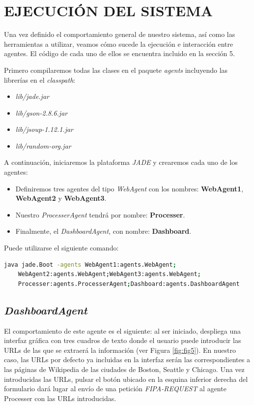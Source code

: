 \documentclass{estilo}
\begin{document}
    \bigskip
    
    \newpage
    \section{EJECUCIÓN DEL SISTEMA}
    
    Una vez definido el comportamiento general de nuestro sistema, así como las herramientas a utilizar, veamos cómo sucede la ejecución e interacción entre agentes. El código de cada uno de ellos se encuentra incluido en la sección 5.
    
    Primero compilaremos todas las clases en el paquete \textit{agents} incluyendo las librerías en el \textit{classpath}:
    
    \begin{itemize}
        \item \textit{lib/jade.jar}
        \item \textit{lib/gson-2.8.6.jar}
        \item \textit{lib/jsoup-1.12.1.jar}
        \item \textit{lib/random-org.jar}
    \end{itemize}
    
    A continuación, iniciaremos la plataforma \textit{JADE} y crearemos cada uno de los agentes:
    
    \begin{itemize}
        \item Definiremos tres agentes del tipo \textit{WebAgent} con los nombres: \textbf{WebAgent1}, \textbf{WebAgent2} y \textbf{WebAgent3}.
        \item Nuestro \textit{ProcesserAgent} tendrá por nombre: \textbf{Processer}.
        \item Finalmente, el \textit{DashboardAgent}, con nombre: \textbf{Dashboard}.
    \end{itemize}
    
    Puede utilizarse el siguiente comando:
    \begin{lstlisting}[language=bash]
    java jade.Boot -agents WebAgent1:agents.WebAgent;
    WebAgent2:agents.WebAgent;WebAgent3:agents.WebAgent;
    Processer:agents.ProcesserAgent;Dashboard:agents.DashboardAgent
    \end{lstlisting}
    
    \subsection{\textit{DashboardAgent}}
    El comportamiento de este agente es el siguiente: al ser iniciado, despliega una interfaz gráfica con tres cuadros de texto donde el usuario puede introducir las URLs de las que se extraerá la información (ver Figura \ref{fig:fig5}). En nuestro caso, las URLs por defecto ya incluidas en la interfaz serán las correspondientes a las páginas de Wikipedia de las ciudades de Boston, Seattle y Chicago. Una vez introducidas las URLs, pulsar el botón ubicado en la esquina inferior derecha del formulario dará lugar al envío de una petición \textit{FIPA-REQUEST} al agente Processer con las URLs introducidas.
    
\end{document}

